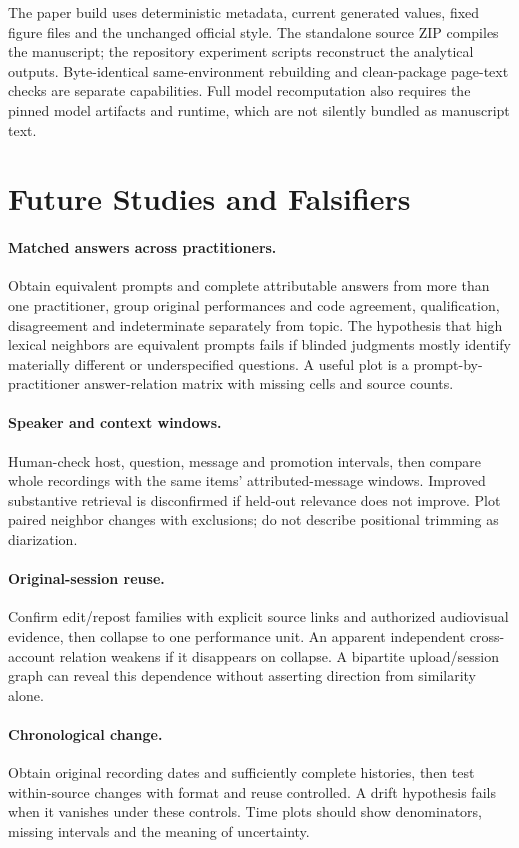 The paper build uses deterministic metadata, current generated values, fixed figure files and the unchanged official style. The standalone source ZIP compiles the manuscript; the repository experiment scripts reconstruct the analytical outputs. Byte-identical same-environment rebuilding and clean-package page-text checks are separate capabilities. Full model recomputation also requires the pinned model artifacts and runtime, which are not silently bundled as manuscript text.

\section{Future Studies and Falsifiers}
\paragraph{Matched answers across practitioners.} Obtain equivalent prompts and complete attributable answers from more than one practitioner, group original performances and code agreement, qualification, disagreement and indeterminate separately from topic. The hypothesis that high lexical neighbors are equivalent prompts fails if blinded judgments mostly identify materially different or underspecified questions. A useful plot is a prompt-by-practitioner answer-relation matrix with missing cells and source counts.

\paragraph{Speaker and context windows.} Human-check host, question, message and promotion intervals, then compare whole recordings with the same items' attributed-message windows. Improved substantive retrieval is disconfirmed if held-out relevance does not improve. Plot paired neighbor changes with exclusions; do not describe positional trimming as diarization.

\paragraph{Original-session reuse.} Confirm edit/repost families with explicit source links and authorized audiovisual evidence, then collapse to one performance unit. An apparent independent cross-account relation weakens if it disappears on collapse. A bipartite upload/session graph can reveal this dependence without asserting direction from similarity alone.

\paragraph{Chronological change.} Obtain original recording dates and sufficiently complete histories, then test within-source changes with format and reuse controlled. A drift hypothesis fails when it vanishes under these controls. Time plots should show denominators, missing intervals and the meaning of uncertainty.

